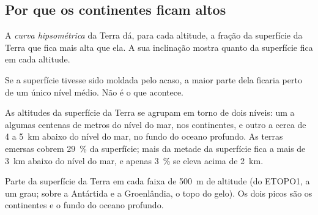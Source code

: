 \subsection{Por que os continentes ficam altos}

\begin{definition}\label{def:g11:lithosphere-asthenosphere:hypsometry}
A \emph{curva hipsométrica} da
Terra dá, para cada altitude, a fração da superfície da Terra que fica mais
alta que ela. A sua inclinação mostra quanto da superfície fica em cada
altitude.
\end{definition}

Se a superfície tivesse sido moldada pelo acaso, a maior parte dela ficaria
perto de um único nível médio. Não é o que acontece.

\begin{proposition}\label{prop:g11:lithosphere-asthenosphere:two-levels}
As altitudes da superfície da Terra se agrupam em torno de dois níveis: um a
algumas centenas de metros do nível do mar, nos continentes, e outro a
cerca de 4 a \qty{5}{km} abaixo do nível do mar, no fundo do oceano
profundo. As terras emersas cobrem \qty{29}{\percent} da superfície; mais da
metade da superfície fica a mais de \qty{3}{km} abaixo do nível do mar, e
apenas \qty{3}{\percent} se eleva acima de \qty{2}{km}.
\end{proposition}

\begin{omfigure}

{\small Parte da superfície da Terra em cada faixa de \qty{500}{m} de
altitude (do ETOPO1, a um grau; sobre a Antártida e a Groenlândia, o topo
do gelo). Os dois picos são os continentes e o fundo do oceano profundo.}
\end{omfigure}

